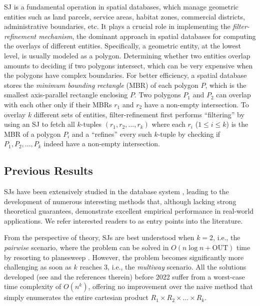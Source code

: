 \documentclass[sigconf]{acmart}
\def\vgap{\vspace{0mm}}
\def\extraspacing{\vspace{1mm} \noindent}
\def\out{\mathrm{OUT}}
\begin{document}
\vgap

SJ is a fundamental operation in spatial databases, which manage geometric entities such as land parcels, service areas, habitat zones, commercial districts, administrative boundaries, etc. It plays a crucial role in implementing the {\em filter-refinement mechanism}, the dominant approach in spatial databases for computing the overlays of different entities. Specifically, a geometric entity, at the lowest level, is usually modeled as a polygon. Determining whether two entities overlap amounts to deciding if two polygons intersect, which can be very expensive when the polygons have complex boundaries. For better efficiency, a spatial database stores the {\em minimum bounding rectangle} (MBR) of each polygon $P$, which is the smallest axis-parallel rectangle enclosing $P$. Two polygons $P_1$ and $P_2$ can overlap with each other only if their MBRs $r_1$ and $r_2$ have a non-empty intersection. To overlay $k$ different sets of entities, filter-refinement first performs ``filtering'' by using an SJ to fetch all $k$-tuples $(r_1, r_2, ..., r_k)$ where each $r_i$ ($1 \le i \le k$) is the MBR of a polygon $P_i$ and a ``refines'' every such $k$-tuple by checking if $P_1, P_2, ..., P_k$ indeed have a non-empty intersection.

\extraspacing {\bf Math Conventions.}

\subsection{Previous Results} \label{sec:intro:prev}

SJs have been extensively studied in the database system , leading to the development of numerous interesting methods that, although lacking strong theoretical guarantees, demonstrate excellent empirical performance in real-world applications. We refer interested readers to \cite{apr+00,mp01,???} as entry points into the literature.

\vgap

From the perspective of theory, SJs are best understood when $k = 2$, i.e., the {\em pairwise} scenario, where the problem can be solved in $O(n \log n + \out)$ time by resorting to planesweep \cite{bcko08}. However, the problem becomes significantly more challenging as soon as $k$ reaches 3, i.e., the {\em multiway} scenario. All the solutions developed (see \cite{mp98,mp01,pmt99,???} and the references therein) before 2022 suffer from a worst-case time complexity of $O(n^k)$, offering no improvement over the naive method that simply enumerates the entire cartesian product $R_1 \times R_2 \times ... \times R_k$.
\end{document}
